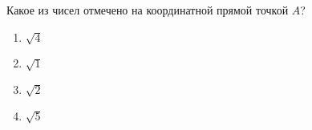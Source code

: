  
\begin{ex}
	Какое из чисел отмечено на координатной прямой точкой $A$?
	
	\selectanswer
	\begin{multicols}{4}
		\begin{enumerate}[label=\arabic*)]
			\item $\sqrt{4}$
			\item $\sqrt{1}$
			\item $\sqrt{2}$
			\item $\sqrt{5}$
		\end{enumerate}
	\end{multicols}
\end{ex}